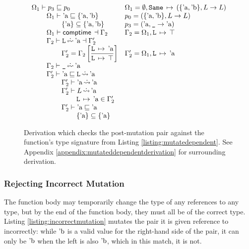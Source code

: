 \documentclass[12pt,twoside]{report}
\begin{document}
\begin{figure}
  \[\begin{array}{ll}
    \Omega_1 \vdash p_3 \subtype p_0 
      & \Omega_1 = \emptyset, \absmapm{Same}{(\{\atom{a}, \atom{b}\}, L \rightarrow L)} \\
    \otab \Omega_1 \vdash \atom{a} \subtype \{\atom{a}, \atom{b}\} &
      p_0 = (\{\atom{a}, \atom{b}\}, L \rightarrow L) \\
    \otab\otab \{\atom{a}\} \subseteq \{\atom{a}, \atom{b}\}   &
      p_3 = (\atom{a}, \mono{\_} \rightarrow \atom{a}) \\
    \otab \Omega_1 \vdash \comptime{} \dashv \Gamma_2 &
      \Gamma_2 = \Omega_1,\absmapm{L}{\top} \\
    \otab \Gamma_2 \vdash \mono{L} \erasedwritearrow \atom{a} \dashv \Gamma_2' \\
    \otab\otab \Gamma_2' = \Gamma_2\left[\dfrac{\absmapm{L}{\atom{a}}}{\absmapm{L}{\top}}\right] &
       \Gamma_2' = \Omega_1,\absmapm{L}{\atom{a}} \\
    \otab \Gamma_2 \vdash \mono{\_} \erasedwritearrow \atom{a} \\
    \otab \Gamma_2' \vdash \atom{a} \subtype \mono{L} \erasedreadarrow \atom{a} \\
    \otab\otab \Gamma_2' \vdash \atom{a} \erasedreadarrow \atom{a} \\
    \otab\otab \Gamma_2' \vdash L \erasedreadarrow \atom{a} \\
    \otab\otab\otab \absmapm{L}{\atom{a}} \in \Gamma_2' \\
    \otab\otab \Gamma_2' \vdash \atom{a} \subtype \atom{a} \\
    \otab\otab\otab \{\atom{a}\} \subseteq \{\atom{a}\} \\
  \end{array}\]
  \caption{Derivation which checks the post-mutation pair against the  function's type signature from Listing \ref{listing:mutatedependent}. See Appendix \ref{appendix:mutateddependentderivation} for surrounding derivation.}
  \label{fig:postmutationderivation}
\end{figure}

\subsubsection{Rejecting Incorrect Mutation}
The function body may temporarily change the type of any references to any type, but by the end of the function body, they must all be of the correct type. Listing \ref{listing:incorrectmutation} mutates the pair it is given reference to incorrectly: while $\text{'b}$ is a valid value for the right-hand side of the pair, it can only be $\text{'b}$ when the left is also $\text{'b}$, which in this match, it is not.
\end{document}
